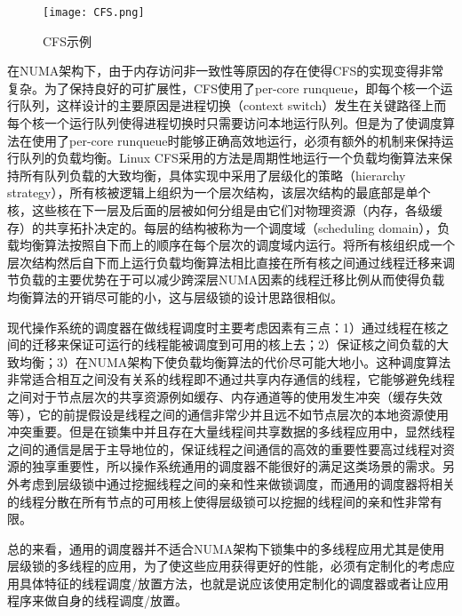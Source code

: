 \begin{figure}[t]
	\centering
	\texttt{[image: CFS.png]}
	\caption{CFS示例}
	\label{Fig:CFS}
\end{figure}

在NUMA架构下，由于内存访问非一致性等原因的存在使得CFS的实现变得非常复杂。为了保持良好的可扩展性，CFS使用了per-core runqueue，即每个核一个运行队列，这样设计的主要原因是进程切换（context switch）发生在关键路径上而每个核一个运行队列使得进程切换时只需要访问本地运行队列。但是为了使调度算法在使用了per-core runqueue时能够正确高效地运行，必须有额外的机制来保持运行队列的负载均衡。Linux CFS采用的方法是周期性地运行一个负载均衡算法来保持所有队列负载的大致均衡，具体实现中采用了层级化的策略（hierarchy strategy），所有核被逻辑上组织为一个层次结构，该层次结构的最底部是单个核，这些核在下一层及后面的层被如何分组是由它们对物理资源（内存，各级缓存）的共享拓扑决定的。每层的结构被称为一个调度域（scheduling domain），负载均衡算法按照自下而上的顺序在每个层次的调度域内运行。将所有核组织成一个层次结构然后自下而上运行负载均衡算法相比直接在所有核之间通过线程迁移来调节负载的主要优势在于可以减少跨深层NUMA因素的线程迁移比例从而使得负载均衡算法的开销尽可能的小，这与层级锁的设计思路很相似。

现代操作系统的调度器在做线程调度时主要考虑因素有三点：1）通过线程在核之间的迁移来保证可运行的线程能被调度到可用的核上去；2）保证核之间负载的大致均衡；3）在NUMA架构下使负载均衡算法的代价尽可能大地小。这种调度算法非常适合相互之间没有关系的线程即不通过共享内存通信的线程，它能够避免线程之间对于节点层次的共享资源例如缓存、内存通道等的使用发生冲突（缓存失效等），它的前提假设是线程之间的通信非常少并且远不如节点层次的本地资源使用冲突重要。但是在锁集中并且存在大量线程间共享数据的多线程应用中，显然线程之间的通信是居于主导地位的，保证线程之间通信的高效的重要性要高过线程对资源的独享重要性\cite{dice2015lock}，所以操作系统通用的调度器不能很好的满足这类场景的需求。另外考虑到层级锁中通过挖掘线程之间的亲和性来做锁调度，而通用的调度器将相关的线程分散在所有节点的可用核上使得层级锁可以挖掘的线程间的亲和性非常有限。

总的来看，通用的调度器并不适合NUMA架构下锁集中的多线程应用尤其是使用层级锁的多线程的应用，为了使这些应用获得更好的性能，必须有定制化的考虑应用具体特征的线程调度/放置方法，也就是说应该使用定制化的调度器或者让应用程序来做自身的线程调度/放置。


